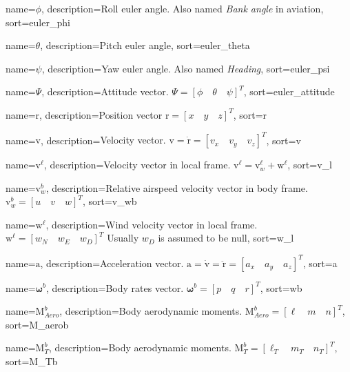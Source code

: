 {
	name={$\phi$},
  	description={Roll euler angle. Also named \textit{Bank angle} in aviation},
  	sort=euler_phi
}

{
	name={$\theta$},
  	description={Pitch euler angle},
  	sort=euler_theta
}

{
	name={$\psi$},
  	description={Yaw euler angle. Also named \textit{Heading}},
	sort=euler_psi
}

{
	name={$\Psi$},
	description={Attitude vector. $\Psi = [\phi \quad \theta \quad \psi]^T$},
	sort=euler_attitude
}

{
	name={$\bm{\mathrm{r}}$},
	description={Position vector $\bm{\mathrm{r}} = [x \quad y \quad z]^{T}$},
  	sort=r
}

{
	name={$\bm{\mathrm{v}}$},
	description={Velocity vector. $\bm{\mathrm{v}} = \bm{\mathrm{\dot{r}}} = [v_x \quad v_y \quad v_z]^T$},
	sort=v
}

{
	name={$\bm{\mathrm{v}}^\ell$},
	description={Velocity vector in local frame. $\bm{\mathrm{v}}^\ell = \bm{\mathrm{v}}_w^\ell + \bm{\mathrm{w}}^\ell$},
	sort=v_l
}

{
	name={$\bm{\mathrm{v}}_w^b$},
	description={Relative airspeed velocity vector in body frame. $\bm{\mathrm{v}}_w^b = [u \quad v \quad w]^T$},
	sort=v_wb
}

{
	name={$\bm{\mathrm{w}}^\ell$},
	description={Wind velocity vector in local frame. $\bm{\mathrm{w}}^\ell = [w_N \quad w_E \quad w_D]^T$
				 Usually $w_D$ is assumed to be null},
	sort=w_l
}


{
	name={$\bm{\mathrm{a}}$},
	description={Acceleration vector. $\bm{\mathrm{a}} = \bm{\mathrm{\dot{v}}} = \bm{\mathrm{\ddot{r}}} = [a_x \quad a_y \quad a_z]^T$},
	sort=a
}

{
	name={$\bm{\omega}^b$},
	description={Body rates vector. $\bm{\omega}^b = [p \quad q \quad r]^T$},
	sort=wb
}

{
	name={$\bm{\mathrm{M}}_{Aero}^b$},
	description={Body aerodynamic moments. $\bm{\mathrm{M}}_{Aero}^b = [\ell \quad m \quad n]^T$},
	sort=M_aerob
}

{
	name={$\bm{\mathrm{M}}_T^b$},
	description={Body aerodynamic moments. $\bm{\mathrm{M}}_T^b = [\ell_T \quad m_T \quad n_T]^T$},
	sort=M_Tb
}

